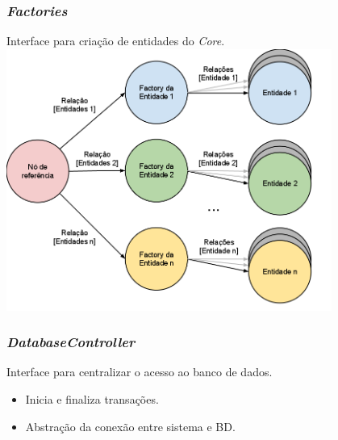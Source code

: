 \frame
{
\frametitle{\emph{Factories}}
Interface para criação de entidades do \emph{Core}.
\includegraphics[width=0.8\textwidth]{./imgs/grafoFactory.png}
}

\frame
{
\frametitle{\emph{DatabaseController}}
Interface para centralizar o acesso ao banco de dados.
\begin{itemize}
\item Inicia e finaliza transações.
\item Abstração da conexão entre sistema e BD.
\end{itemize}
}


